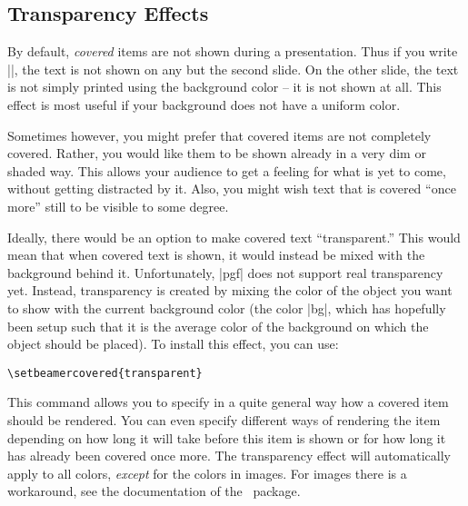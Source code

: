 \subsection{Transparency Effects}
\label{section-transparent}

By default, \emph{covered} items are not shown during a
presentation. Thus if you write ||, the text
is not shown on any but the second slide. On the other slide, the text
is not simply printed using the background color -- it is not shown at
all. This effect is most useful if your background does not have a
uniform color.

Sometimes however, you might prefer that covered items are not
completely covered. Rather, you would like them to be shown already in
a very dim or shaded way. This allows your audience to get a feeling
for what is yet to come, without getting distracted by it. Also, you
might wish text that is covered ``once more'' still to be visible to
some degree.

Ideally, there would be an option to make covered text
``transparent.'' This would mean that when covered text is shown, it
would instead be mixed with the background behind it. Unfortunately,
|pgf| does not support real transparency yet. Instead, transparency is
created by mixing the color of the object you want to show with the
current background color (the color |bg|, which has hopefully been
setup such that it is the average color of the background on which the
object should be placed). To install this effect, you can use:
\begin{verbatim}
\setbeamercovered{transparent}
\end{verbatim}
This command allows you to specify in a quite general way how a
covered item should be rendered. You can even specify different ways
of rendering the item depending on how long it will take before this
item is shown or for how long it has already been covered once
more. The transparency effect will automatically apply to all colors,
\emph{except} for the colors in images. For images there is a
workaround, see the documentation of the \pgfname\ package. 

